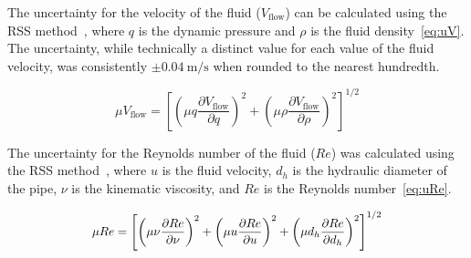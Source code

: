 \documentclass[journal,letterpaper]{IEEEtran}
\begin{document}
The uncertainty for the velocity of the fluid ($V_\text{flow}$) can be calculated using the RSS method~\cite{MoMLecture}, where $q$ is the dynamic pressure and $\rho$ is the fluid density~\eqref{eq:uV}.
The uncertainty, while technically a distinct value for each value of the fluid velocity, was consistently $\pm \qty{0.04}{\m\per\s}$ when rounded to the nearest hundredth.

\begin{equation} \label{eq:uV}
    \mu V_\text{flow} = \left[\left(\mu q \frac{\partial V_\text{flow}}{\partial q}\right)^2 + \left(\mu \rho \frac{\partial V_\text{flow}}{\partial \rho}\right)^2\right]^{1/2}
\end{equation}

The uncertainty for the Reynolds number of the fluid ($Re$) was calculated using the RSS method~\cite{MoMLecture}, where $u$ is the fluid velocity, $d_h$ is the hydraulic diameter of the pipe, $\nu$ is the kinematic viscosity, and $Re$ is the Reynolds number~\eqref{eq:uRe}.

\begin{equation} \label{eq:uRe}
    \resizebox{227pt}{!}{$\displaystyle{\mu Re = \left[\left(\mu \nu \frac{\partial Re}{\partial \nu}\right)^2 + \left(\mu u \frac{\partial Re}{\partial u}\right)^2 + \left(\mu d_h \frac{\partial Re}{\partial d_h}\right)^2\right]^{1/2}}$}
\end{equation}
\end{document}
